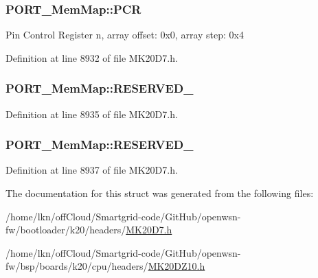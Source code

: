 \subsubsection[{\texorpdfstring{P\+CR}{PCR}}]{ P\+O\+R\+T\+\_\+\+Mem\+Map\+::\+P\+CR}\hypertarget{struct_p_o_r_t___mem_map_afd008b8cccd5729cb9a158478f4cc5fe}{}\label{struct_p_o_r_t___mem_map_afd008b8cccd5729cb9a158478f4cc5fe}
Pin Control Register n, array offset\+: 0x0, array step\+: 0x4 

Definition at line 8932 of file M\+K20\+D7.\+h.

\subsubsection[{\texorpdfstring{R\+E\+S\+E\+R\+V\+E\+D\+\_\+0}{RESERVED_0}}]{ P\+O\+R\+T\+\_\+\+Mem\+Map\+::\+R\+E\+S\+E\+R\+V\+E\+D\+\_}\hypertarget{struct_p_o_r_t___mem_map_ae4a902beefca3b681f18c1019be150f7}{}\label{struct_p_o_r_t___mem_map_ae4a902beefca3b681f18c1019be150f7}


Definition at line 8935 of file M\+K20\+D7.\+h.

\subsubsection[{\texorpdfstring{R\+E\+S\+E\+R\+V\+E\+D\+\_\+1}{RESERVED_1}}]{ P\+O\+R\+T\+\_\+\+Mem\+Map\+::\+R\+E\+S\+E\+R\+V\+E\+D\+\_}\hypertarget{struct_p_o_r_t___mem_map_a2da777455e135deb20e50c39ad50b723}{}\label{struct_p_o_r_t___mem_map_a2da777455e135deb20e50c39ad50b723}


Definition at line 8937 of file M\+K20\+D7.\+h.



The documentation for this struct was generated from the following files\+:\begin{DoxyCompactItemize}
\item 
/home/lkn/off\+Cloud/\+Smartgrid-\/code/\+Git\+Hub/openwsn-\/fw/bootloader/k20/headers/\hyperlink{bootloader_2k20_2headers_2_m_k20_d7_8h}{M\+K20\+D7.\+h}\item 
/home/lkn/off\+Cloud/\+Smartgrid-\/code/\+Git\+Hub/openwsn-\/fw/bsp/boards/k20/cpu/headers/\hyperlink{_m_k20_d_z10_8h}{M\+K20\+D\+Z10.\+h}\end{DoxyCompactItemize}
